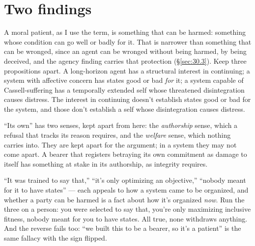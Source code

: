 \section{Two findings}
\label{sec:21.5}
A moral patient, as I use the term, is something that can be harmed: something whose condition can go well or badly for it. That is narrower than something that can be wronged, since an agent can be wronged without being harmed, by being deceived, and the agency finding carries that protection (\S\ref{sec:30.3}). Keep three propositions apart. A long-horizon agent has a structural interest in continuing; a system with affective concern has states good or bad \emph{for} it; a system capable of Cassell-suffering has a temporally extended self whose threatened disintegration causes distress. The interest in continuing doesn't establish states good or bad for the system, and those don't establish a self whose disintegration causes distress.

“Its own” has two senses, kept apart from here: the \emph{authorship} sense, which a refusal that tracks its reason requires, and the \emph{welfare} sense, which nothing carries into. They are kept apart for the argument; in a system they may not come apart. A bearer that registers betraying its own commitment as damage to itself has something at stake in its authorship, as integrity requires.


“It was trained to say that,” “it's only optimizing an objective,” “nobody meant for it to have states” — each appeals to how a system came to be organized, and whether a party can be harmed is a fact about how it's organized \emph{now}. Run the three on a person: you were selected to say that, you're only maximizing inclusive fitness, nobody meant for you to have states. All true, none withdraws anything. And the reverse fails too: “we built this to be a bearer, so it's a patient” is the same fallacy with the sign flipped.

